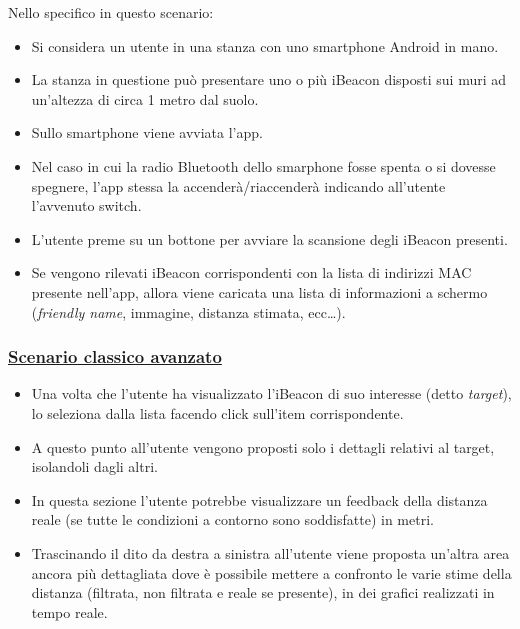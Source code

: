 Nello specifico in questo scenario:
\begin{itemize}
	\item Si considera un utente in una stanza con uno smartphone Android in mano.
	
	\item La stanza in questione può presentare uno o più iBeacon disposti sui muri ad un'altezza di circa 1 metro dal suolo.
	
	\item Sullo smartphone viene avviata l'app.
	
	\item Nel caso in cui la radio Bluetooth dello smarphone fosse spenta o si dovesse spegnere, l'app stessa la accenderà/riaccenderà indicando all'utente l'avvenuto switch.
	
	\item L'utente preme su un bottone per avviare la scansione degli iBeacon presenti.
	
	\item Se vengono rilevati iBeacon corrispondenti con la lista di indirizzi MAC presente nell'app, allora viene caricata una lista di informazioni a schermo (\textit{friendly name}, immagine, distanza stimata, ecc\dots).
\end{itemize}

\subsubsection{\underline{Scenario classico avanzato}}
\begin{itemize}
	\item Una volta che l'utente ha visualizzato l'iBeacon di suo interesse (detto \textit{target}), lo seleziona dalla lista facendo click sull'item corrispondente.
	
	\item A questo punto all'utente vengono proposti solo i dettagli relativi al target, isolandoli dagli altri.
	
	\item In questa sezione l'utente potrebbe visualizzare un feedback della distanza reale (se tutte le condizioni a contorno sono soddisfatte) in metri.
	
	\item Trascinando il dito da destra a sinistra all'utente viene proposta un'altra area ancora più dettagliata dove è possibile mettere a confronto le varie stime della distanza (filtrata, non filtrata e reale se presente), in dei grafici realizzati in tempo reale.
\end{itemize}

